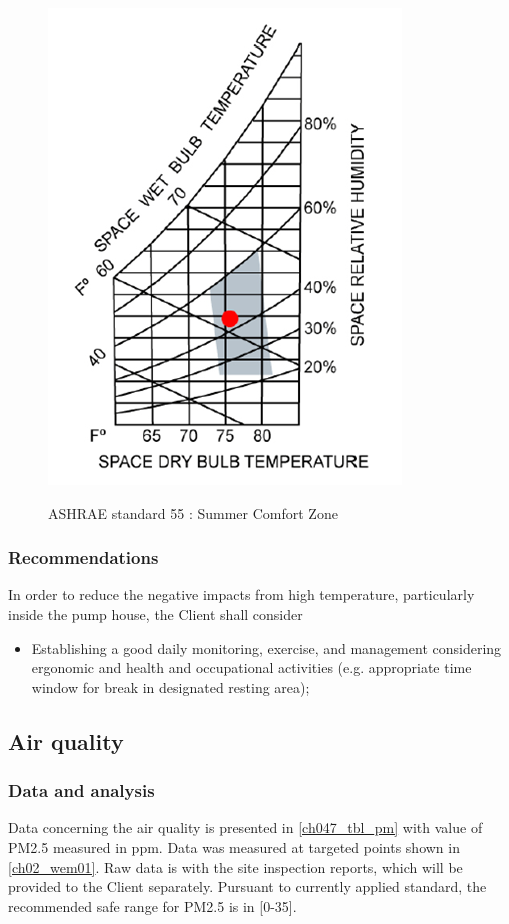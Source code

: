 \begin{figure}[!htb]
	\includegraphics[scale=2]{figures/ch047_ashrae_psychrometrics} \\
	\caption{ASHRAE standard 55 : Summer Comfort Zone}
	\label{ch047_ashrae_psychrometrics} 
\end{figure}

\subsubsection{Recommendations}
In order to reduce the negative impacts from high temperature, particularly inside the pump house, the Client shall consider

\begin{itemize}
	\item Establishing a good daily monitoring, exercise, and management considering ergonomic and health and occupational activities (e.g. appropriate time window for break in designated resting area);

\end{itemize}

\subsection{Air quality}\label{aq01}

\subsubsection{Data and analysis}
Data concerning the air quality is presented in \ref{ch047_tbl_pm} with value of PM2.5 measured in ppm. Data was measured at targeted points shown in \ref{ch02_wem01}. Raw data is with the site inspection reports, which will be provided to the Client separately. Pursuant to currently applied standard, the recommended safe range for PM2.5 is in [0-35].

